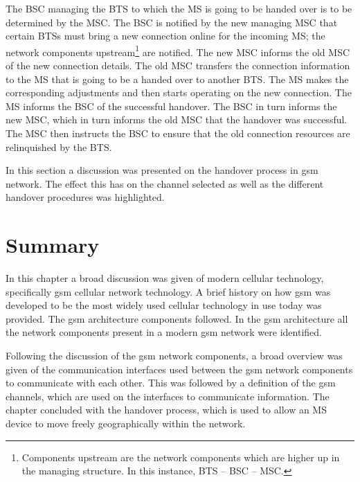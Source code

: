 \begin{description}
The \gls{BSC} managing the \gls{BTS} to which the \gls{MS} is going to be handed over is to be determined by the MSC\@\cite{wirelesstelcoMullet}. The \gls{BSC} is notified by the new managing \gls{MSC} that certain \glspl{BTS} must bring a new connection online for the incoming \gls{MS}; the network components upstream\footnote{Components upstream are the network components which are higher up in the managing structure. In this instance, \gls{BTS} -- \gls{BSC} -- \gls{MSC}\@.} are notified\cite{wirelesstelcoMullet,GSMArchitectureProtocolsServices}.
The new \gls{MSC} informs the old \gls{MSC} of the new connection details. The old \gls{MSC} transfers the connection information to the \gls{MS} that is going to be a handed over to another \gls{BTS}\@\cite{wirelesstelcoMullet}. The \gls{MS} makes the corresponding adjustments and then starts operating on the new connection. The \gls{MS} informs the \gls{BSC} of the successful handover\cite{wirelesstelcoMullet,GSMArchitectureProtocolsServices}. 
The \gls{BSC} in turn informs the new \gls{MSC}, which in turn informs the old \gls{MSC} that the handover was successful. The \gls{MSC} then instructs the \gls{BSC} to ensure that the old connection resources are relinquished by the \gls{BTS}.
\end{description}

In this section a discussion was presented on the handover process in \gls{gsm} network. The effect this has on the channel selected as well as the different handover procedures was highlighted. 
\section{Summary}
In this chapter a broad discussion was given of modern cellular technology, specifically \gls{gsm} cellular network technology. A brief history on how \gls{gsm} was developed to be the most widely used cellular technology in use today was provided. The \gls{gsm} architecture components followed. In the \gls{gsm} architecture all the network components present in a modern \gls{gsm} network were identified.

Following the discussion of the \gls{gsm} network components, a broad overview was given of the communication interfaces used between the \gls{gsm} network components to communicate with each other. This was followed by a definition of the \gls{gsm} channels, which are used on the interfaces to communicate information.
The chapter concluded with the handover process, which is used to allow an \gls{MS} device to move freely geographically within the network. 
